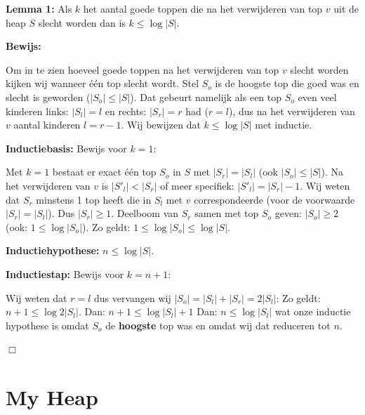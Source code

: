 \documentclass[12pt,a4paper,fleqn]{report}
\begin{document}
	\textbf{Lemma 1:} Als $k$ het aantal goede toppen die na het verwijderen van top $v$ uit de heap $S$ slecht worden dan is
	$k \leq \log |S|$.
	\newline

	\textbf{Bewijs:}

	Om in te zien hoeveel goede toppen na het verwijderen van top $v$ slecht worden kijken
	wij wanneer één top slecht wordt.
	Stel $S_o$ is de hoogste top die goed was en slecht is geworden ($|S_o| \leq |S|$).
	Dat gebeurt namelijk als een top $S_o$ even veel kinderen links: $|S_l| = l$ en rechts:
	$|S_r| = r$ had ($r=l$), dus na het verwijderen van $v$ aantal kinderen $l = r - 1$.
	\newline
	Wij bewijzen dat $k \leq \log |S|$ met inductie.
	\newline

	\textbf{Inductiebasis:} Bewijs voor $k = 1$:

	Met $k = 1$ bestaat er exact één top $S_o$ in $S$ met $|S_r| = |S_l|$
	(ook $|S_o| \leq |S|$).
	Na het verwijderen van $v$ is $|S'_l| < |S_r|$ of
	meer specifiek: $|S'_l| = |S_r| - 1$.
	\newline
	Wij weten dat $S_r$ minstens 1 top heeft die in $S_l$ met $v$ correspondeerde (voor de voorwaarde $|S_r| = |S_l|$). Dus $|S_r| \geq 1$.
	\newline
	Deelboom van $S_r$ samen met top $S_o$ geven: $|S_o| \geq 2$ (ook: $ 1 \leq \log |S_o|$).
	\newline
	Zo geldt: $1 \leq \log |S_o| \leq \log |S|$.
	\newline

	\textbf{Inductiehypothese:} $n \leq \log |S|$.
	\newline

	\textbf{Inductiestap:} Bewijs voor $k = n + 1$:

	Wij weten dat $r = l$ dus vervangen wij $|S_o| = |S_l| + |S_r| = 2|S_l|$:
	\newline
	Zo geldt: $n + 1 \leq \log 2|S_l|$.
	\newline
	Dan: $n + 1 \leq \log |S_l| + 1$
	\newline
	Dan: $n \leq \log |S_l|$ wat onze inductie hypothese is omdat $S_o$ de \textbf{hoogste} top was en omdat wij dat reduceren tot $n$.

	\begin{flushright}
	$\Box$
	\end{flushright}

	\chapter{My Heap}
\end{document}

